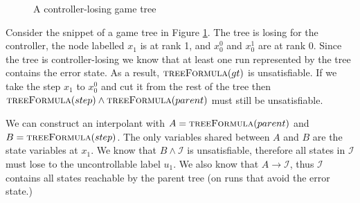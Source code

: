 \documentclass{llncs}
\begin{document}
\begin{figure}
    \centering
    \caption{A controller-losing game tree}
    \label{fig:interpolatetree}
\end{figure}

Consider the snippet of a game tree in Figure \ref{fig:interpolatetree}. The
tree is losing for the controller, the node labelled $x_1$ is at rank 1, and
$x_0^0$ and $x_0^1$ are at rank 0. Since the tree is controller-losing we know
that at least one run represented by the tree contains the error state.  As
a result, $\textsc{treeFormula}(gt)$ is unsatisfiable. If we take the step
$x_1$ to $x_0^0$ and cut it from the rest of the tree then
$\textsc{treeFormula}(step) \land \textsc{treeFormula}(parent)$ must still be
unsatisfiable.

We can construct an interpolant with $A = \textsc{treeFormula}(parent)$ and $B
= \textsc{treeFormula}(step)$. The only variables shared between $A$ and $B$
are the state variables at $x_1$. We know that $B \land \mathcal{I}$ is
unsatisfiable, therefore all states in $\mathcal{I}$ must lose to the
uncontrollable label $u_1$. We also know that $A \to \mathcal{I}$, thus
$\mathcal{I}$ contains all states reachable by the parent tree (on runs that
avoid the error state.)
\end{document}
